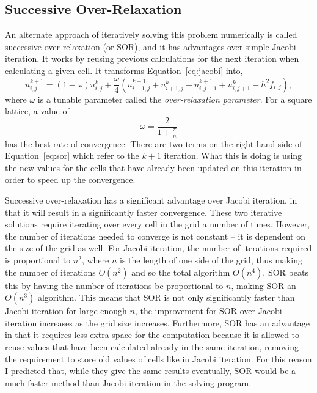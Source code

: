 \subsection{Successive Over-Relaxation}

An alternate approach of iteratively solving this problem numerically is called successive over-relaxation (or SOR), and
it has advantages over simple Jacobi iteration. It works by reusing previous calculations for the next iteration when
calculating a given cell. It transforms Equation~\ref{eq:jacobi} into,
\begin{equation} \label{eq:sor}
	u_{i,j}^{k+1} = (1-\omega) u_{i,j}^{k} + \frac{\omega}{4}\left(u_{i-1,j}^{k+1} + u_{i+1,j}^{k} + u_{i,j-1}^{k+1} + u_{i,j+1}^{k} - h^2 f_{i,j}\right),
\end{equation}
where $\omega$ is a tunable parameter called the \textit{over-relaxation parameter}. For a square lattice, a value of
$$\omega = \frac{2}{1+\frac{\pi}{n}}$$
has the best rate of convergence\cite{poisson-relax}. There are two terms on the right-hand-side of Equation~\ref{eq:sor} which refer to the
$k+1$ iteration. What this is doing is using the new values for the cells that have already been updated on this iteration
in order to speed up the convergence.

Successive over-relaxation has a significant advantage over Jacobi iteration, in that it will result in a significantly faster convergence.
These two iterative solutions require iterating over every cell in the grid a number of times. However, the number of iterations needed to
converge is not constant -- it is dependent on the size of the grid as well. For Jacobi iteration, the number of iterations required is
proportional to $n^2$, where $n$ is the length of one side of the grid, thus making the number of iterations $O(n^2)$ and so the total
algorithm $O(n^4)$. SOR beats this by having the number of iterations be proportional to $n$, making SOR an $O(n^3)$ algorithm\cite{poisson-relax}. This means
that SOR is not only significantly faster than Jacobi iteration for large enough $n$, the improvement for SOR over Jacobi iteration increases
as the grid size increases. Furthermore, SOR has an advantage in that it requires less extra space for the computation because it is allowed
to reuse values that have been calculated already in the same iteration, removing the requirement to store old values of cells like in Jacobi
iteration. For this reason I predicted that, while they give the same results eventually, SOR would be a much faster method than Jacobi
iteration in the solving program.






